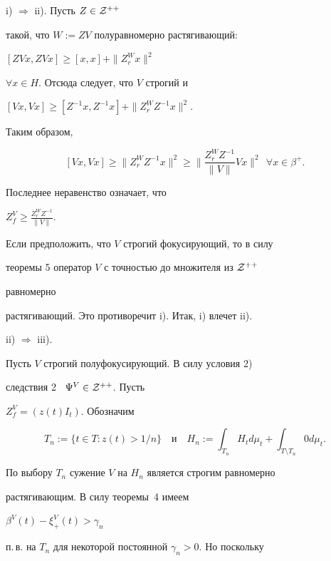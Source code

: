 \begin{pf}


i) $\Rightarrow$ ii). Пусть $Z\in {\cal Z}^{++}$


такой, что $W:=ZV$ полуравномерно растягивающий:


$[ZVx,ZVx]\geq [x,x]+\| Z_{r}^{W}x\|^{2}$


$\forall x\in H$. Отсюда следует, что $V$ строгий и


$[Vx,Vx]\geq [Z^{-1}x,Z^{-1}x]+\| Z^{W}_{r}Z^{-1}x\|^{2}$.


Таким образом,


$$


[Vx,Vx]\geq\| Z^{W}_{r}Z^{-1}x\|^{2}\geq \bigg\| \frac{Z^{W}_{r}Z^{-1}}


{\| V\|}Vx\bigg\|^{2}


\ \ \forall x\in \beta^{+}.


$$


Последнее неравенство означает, что


$Z_{f}^{V}\geq \frac{Z^{W}_{r}Z^{-1}}{\|V\|}$.


Если предположить, что $V$ строгий фокусирующий, то в силу


теоремы 5 оператор $V$ с точностью до множителя из ${\cal Z}^{++}$


равномерно


растягивающий. Это противоречит i). Итак, i) влечет ii).





ii) $\Rightarrow$ iii).


Пусть $V$ строгий полуфокусирующий. В силу условия 2)


следствия 2 \ $\Psi^{V}\in {\cal Z}^{++}$. Пусть


$Z^{V}_{f}=(z(t)I_{t})$. Обозначим


$$


T_{n}:=\{t\in T: z(t)>1/n\}\quad \text{и}\quad


H_{n}:=\int_{T_{n}}H_{t}d\mu_{t}+


\int_{T\setminus T_{n}}0d\mu_{t}.


$$


По выбору $T_{n}$ сужение $V$ на $H_{n}$ является строгим равномерно


растягивающим. В силу теоремы~4 имеем 


$\beta^{V}(t)-\xi_{+}^{V}(t)>\gamma_{n}$


п.\,в. на $T_{n}$ для некоторой постоянной $\gamma_{n}>0$. Но поскольку



\end{pf}
